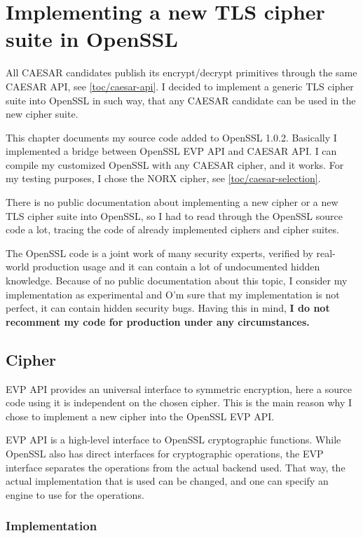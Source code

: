 \chapter{Implementing a new TLS cipher suite in OpenSSL}

All CAESAR candidates publish its encrypt/decrypt primitives through the same CAESAR API, see \autoref{toc/caesar-api}. I decided to implement a generic TLS cipher suite into OpenSSL in such way, that any CAESAR candidate can be used in the new cipher suite.

This chapter documents my source code added to OpenSSL 1.0.2. Basically I implemented a bridge between OpenSSL EVP API and CAESAR API. I can compile my customized OpenSSL with any CAESAR cipher, and it works. For my testing purposes, I chose the NORX cipher, see \autoref{toc/caesar-selection}.

There is no public documentation about implementing a new cipher or a new TLS cipher suite into OpenSSL, so I had to read through the OpenSSL source code a lot, tracing the code of already implemented ciphers and cipher suites.

The OpenSSL code is a joint work of many security experts, verified by real-world production usage and it can contain a lot of undocumented hidden knowledge. Because of no public documentation about this topic, I consider my implementation as experimental and O'm sure that my implementation is not perfect, it can contain hidden security bugs. Having this in mind, \textbf{I do not recomment my code for production under any circumstances.}

\section{Cipher}
\label{toc/implementation-cipher}

EVP API provides an universal interface to symmetric encryption, here a source code using it is independent on the chosen cipher. This is the main reason why I chose to implement a new cipher into the OpenSSL EVP API.

EVP API is a high-level interface to OpenSSL cryptographic functions. While OpenSSL also has direct interfaces for cryptographic operations, the EVP interface separates the operations from the actual backend used. That way, the actual implementation that is used can be changed, and one can specify an engine to use for the operations.

\subsection{Implementation}


